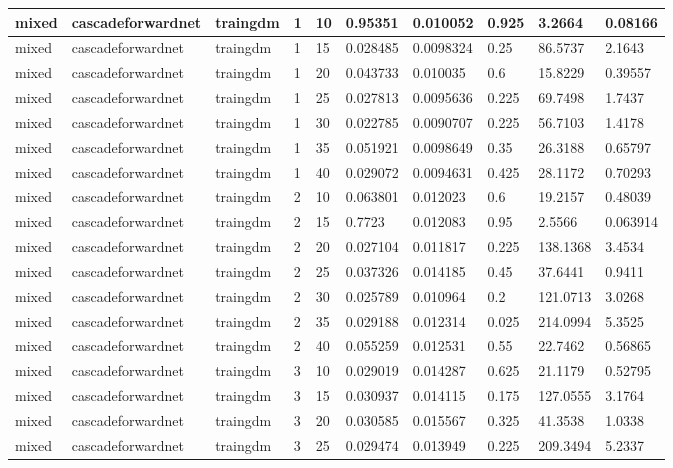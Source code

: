 \begin{longtable}{lllllllll}
mixed & cascadeforwardnet & traingdm & 1 & 10 & 0.95351 & 0.010052 & 0.925 & 3.2664 & 0.08166 \\ \hline 
mixed & cascadeforwardnet & traingdm & 1 & 15 & 0.028485 & 0.0098324 & 0.25 & 86.5737 & 2.1643 \\ \hline 
mixed & cascadeforwardnet & traingdm & 1 & 20 & 0.043733 & 0.010035 & 0.6 & 15.8229 & 0.39557 \\ \hline 
mixed & cascadeforwardnet & traingdm & 1 & 25 & 0.027813 & 0.0095636 & 0.225 & 69.7498 & 1.7437 \\ \hline 
mixed & cascadeforwardnet & traingdm & 1 & 30 & 0.022785 & 0.0090707 & 0.225 & 56.7103 & 1.4178 \\ \hline 
mixed & cascadeforwardnet & traingdm & 1 & 35 & 0.051921 & 0.0098649 & 0.35 & 26.3188 & 0.65797 \\ \hline 
mixed & cascadeforwardnet & traingdm & 1 & 40 & 0.029072 & 0.0094631 & 0.425 & 28.1172 & 0.70293 \\ \hline 
mixed & cascadeforwardnet & traingdm & 2 & 10 & 0.063801 & 0.012023 & 0.6 & 19.2157 & 0.48039 \\ \hline 
mixed & cascadeforwardnet & traingdm & 2 & 15 & 0.7723 & 0.012083 & 0.95 & 2.5566 & 0.063914 \\ \hline 
mixed & cascadeforwardnet & traingdm & 2 & 20 & 0.027104 & 0.011817 & 0.225 & 138.1368 & 3.4534 \\ \hline 
mixed & cascadeforwardnet & traingdm & 2 & 25 & 0.037326 & 0.014185 & 0.45 & 37.6441 & 0.9411 \\ \hline 
mixed & cascadeforwardnet & traingdm & 2 & 30 & 0.025789 & 0.010964 & 0.2 & 121.0713 & 3.0268 \\ \hline 
mixed & cascadeforwardnet & traingdm & 2 & 35 & 0.029188 & 0.012314 & 0.025 & 214.0994 & 5.3525 \\ \hline 
mixed & cascadeforwardnet & traingdm & 2 & 40 & 0.055259 & 0.012531 & 0.55 & 22.7462 & 0.56865 \\ \hline 
mixed & cascadeforwardnet & traingdm & 3 & 10 & 0.029019 & 0.014287 & 0.625 & 21.1179 & 0.52795 \\ \hline 
mixed & cascadeforwardnet & traingdm & 3 & 15 & 0.030937 & 0.014115 & 0.175 & 127.0555 & 3.1764 \\ \hline 
mixed & cascadeforwardnet & traingdm & 3 & 20 & 0.030585 & 0.015567 & 0.325 & 41.3538 & 1.0338 \\ \hline 
mixed & cascadeforwardnet & traingdm & 3 & 25 & 0.029474 & 0.013949 & 0.225 & 209.3494 & 5.2337 \\ \hline 

\end{longtable}
